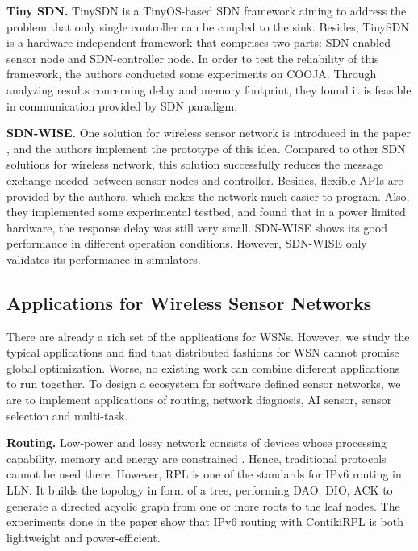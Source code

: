 \textbf{Tiny SDN.}
TinySDN \cite{de2015tinysdn} is a TinyOS-based SDN framework aiming to 
address the problem that only single controller can be coupled to the sink. 
Besides, TinySDN is a hardware independent framework that comprises two parts: 
SDN-enabled sensor node and SDN-controller node. 
In order to test the reliability of this framework, the authors conducted some experiments on COOJA. 
Through analyzing results concerning delay and memory 
footprint, they found it is feasible in communication provided by SDN paradigm.

\textbf{SDN-WISE.}
One solution for wireless sensor network is introduced in the paper \cite{galluccio2015sdn}, 
and the authors implement the prototype of this idea. Compared to other SDN solutions for wireless network, 
this solution successfully reduces the message exchange needed between sensor nodes and controller. 
Besides, flexible APIs are provided by the authors, which makes the network much easier to program. 
Also, they implemented some experimental testbed, and found that in a power limited hardware, the response delay was still very small. 
SDN-WISE shows its good performance in different operation conditions. However, SDN-WISE only validates its performance in simulators. 


\subsection{Applications for Wireless Sensor Networks}


There are already a rich set of the applications for WSNs. 
However, we study the typical applications and find that
distributed fashions for WSN cannot 
promise global optimization. %
Worse, no existing work can combine different applications to run together.
To design a ecosystem for software defined sensor networks, we are to implement applications of
routing, network diagnosis, AI sensor, sensor selection and multi-task.




\textbf{Routing.}
Low-power and lossy network consists of devices whose processing capability, 
memory and energy are constrained \cite{Winter2012}. Hence, traditional 
protocols cannot be used there. However, RPL is one of the standards for IPv6\cite{Deering1998Internet} routing in LLN. 
It builds the topology in form of a tree, performing DAO, DIO, ACK to generate a directed acyclic graph 
from one or more roots to the leaf nodes. The experiments done in the paper \cite{Tsiftes2010a} show 
that IPv6 routing with ContikiRPL is both lightweight and power-efficient.
 
